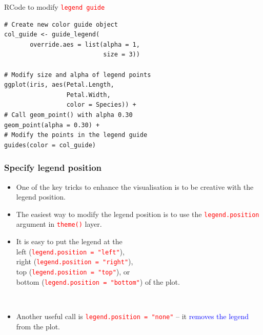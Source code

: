 \documentclass{beamer}
\begin{document}
\begin{frame}[fragile]{RCode to modify \texttt{\textcolor{red}{legend guide}}}
\begin{lstlisting}
# Create new color guide object
col_guide <- guide_legend(
       override.aes = list(alpha = 1,
                           size = 3))
                                   
# Modify size and alpha of legend points                           
ggplot(iris, aes(Petal.Length, 
                 Petal.Width,
                 color = Species)) +
# Call geom_point() with alpha 0.30
geom_point(alpha = 0.30) +
# Modify the points in the legend guide
guides(color = col_guide)
\end{lstlisting}
\end{frame}

\begin{frame}\frametitle{Specify legend position}
\begin{itemize}
\item One of the key tricks to enhance the visualisation is to be creative with the legend position.

\vspace{0.2in}

\item<2-> The easiest way to modify the legend position is to use the \texttt{\textcolor{red}{legend.position}} argument in \texttt{\textcolor{red}{theme()}} layer.

\vspace{0.2in}

\item<3-> It is easy to put the legend at the \\ left (\texttt{\textcolor{red}{legend.position = "left"}}), \\ right (\texttt{\textcolor{red}{legend.position = "right"}}), \\ top (\texttt{\textcolor{red}{legend.position = "top"}}), or \\ bottom (\texttt{\textcolor{red}{legend.position = "bottom"}}) of the plot.

\

\vspace{0.2in} 

\item<4-> Another useful call is \texttt{\textcolor{red}{legend.position = "none"}} -- it \textcolor{blue}{removes the legend} from the plot.
\end{itemize}
\end{frame}
\end{document}
